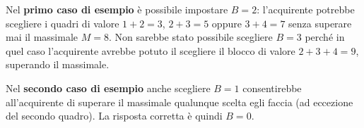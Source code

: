 \pagebreak

\Examples
\begin{example}
%
%
\end{example}

\Explanation

Nel \textbf{primo caso di esempio} è possibile impostare $B=2$: l'acquirente potrebbe scegliere i quadri di valore $1+2=3$, $2+3=5$ oppure $3+4=7$ senza superare mai il massimale $M=8$. Non sarebbe stato possibile scegliere $B=3$ perché in quel caso l'acquirente avrebbe potuto il scegliere il blocco di valore $2+3+4=9$, superando il massimale.

Nel \textbf{secondo caso di esempio} anche scegliere $B=1$ consentirebbe all'acquirente di superare il massimale qualunque scelta egli faccia (ad eccezione del secondo quadro). La risposta corretta è quindi $B=0$.
